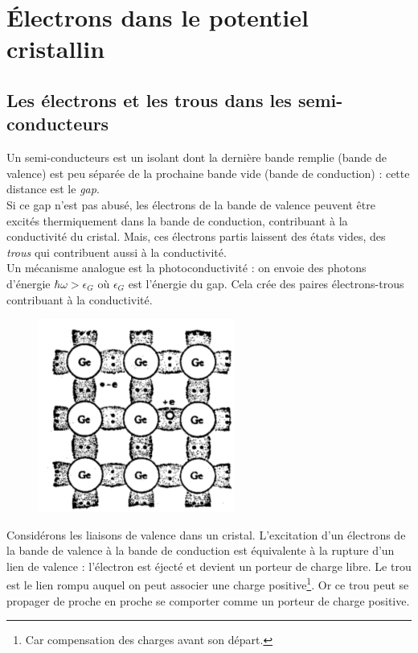 \chapter{Électrons dans le potentiel cristallin}
	\section{Les électrons et les trous dans les semi-conducteurs}
	Un semi-conducteurs est un isolant dont la dernière bande remplie (bande 
	de valence) est peu séparée de la prochaine bande vide (bande de conduction)
	: cette distance est le \textit{gap}. \\
	Si ce gap n'est pas abusé, les électrons de la bande de valence peuvent être 
	excités thermiquement dans la bande de conduction, contribuant à la 
	conductivité du cristal. Mais, ces électrons partis laissent des états vides, 
	des \textit{trous} qui contribuent aussi à la conductivité.\\
	Un mécanisme analogue est la photoconductivité : on envoie des photons 
	d'énergie $\hbar\omega > \epsilon_G$ où $\epsilon_G$ est l'énergie du gap. 
	Cela crée des paires électrons-trous contribuant à la conductivité.\\
	
	\begin{figure}
	\vspace{-0.8cm}
	\includegraphics[scale=0.4]{ch8/image1.png}
	\end{figure}
	Considérons les liaisons de valence dans un cristal. L'excitation d'un 
	électrons de la bande de valence à la bande de conduction est équivalente 
	à la rupture d'un lien de valence : l'électron est éjecté et devient 
	un porteur de charge libre. Le trou est le lien rompu auquel on peut 
	associer une charge positive\footnote{Car compensation des charges avant 
	son départ.}. Or ce trou peut se propager de proche en proche se comporter 
	comme un porteur de charge positive. 
	
